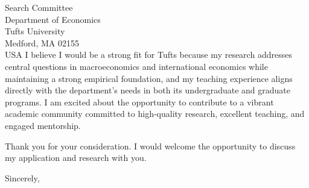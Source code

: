 \documentclass[11pt,letterpaper]{letter}
\begin{document}
\begin{letter}{Search Committee \\
Department of Economics \\
Tufts University \\
Medford, MA 02155 \\ USA}
I believe I would be a strong fit for Tufts because my research addresses central questions in macroeconomics and international economics while maintaining a strong empirical foundation, and my teaching experience aligns directly with the department’s needs in both its undergraduate and graduate programs. I am excited about the opportunity to contribute to a vibrant academic community committed to high-quality research, excellent teaching, and engaged mentorship.

Thank you for your consideration. I would welcome the opportunity to discuss my application and research with you.

\closing{Sincerely,}

\end{letter}
\end{document}
